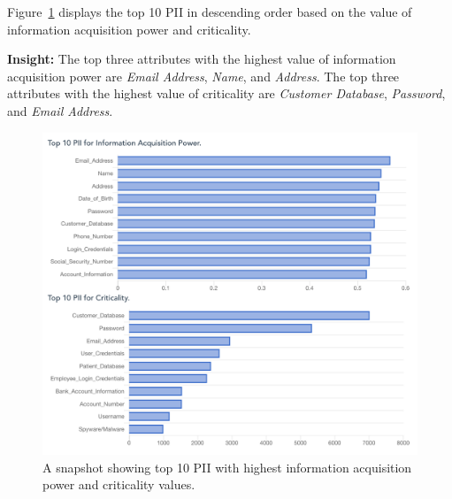 \documentclass[conference]{IEEEtran}
\begin{document}
Figure~\ref{fig:top10_closeness_betweenness_centrality} displays the top 10 PII in descending order based on the value of information acquisition power and criticality.

{\bf Insight:} The top three attributes with the highest value of information acquisition power are \textit{Email Address}, \textit{Name}, and \textit{Address}. The top three attributes with the highest value of criticality are \textit{Customer Database}, \textit{Password}, and \textit{Email Address}. 

\begin{figure}[ht!]
  \includegraphics[width=\linewidth]{top10_closeness_betweenness_centrality.png}
  \caption{A snapshot showing  top  10  PII  with  highest information acquisition power and criticality values.}
  \label{fig:top10_closeness_betweenness_centrality}
\end{figure}
\end{document}
